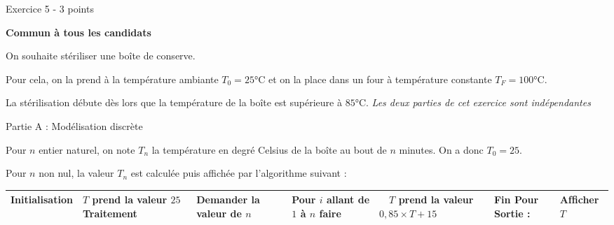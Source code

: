 
%
\begin{h2}Exercice 5 - 3 points\end{h2}
\textbf{Commun à tous les candidats}
\par
On souhaite stériliser une boîte de conserve.
\par
Pour cela, on la prend à la température ambiante $T_0 = 25$°C et on la place dans un four à température constante $T_F = 100$°C.
\par
La stérilisation débute dès lors que la température de la boîte est supérieure à $85$°C.
\textit{Les deux parties de cet exercice sont indépendantes}
\begin{h3}Partie A : Modélisation discrète\end{h3}
Pour $n$ entier naturel, on note $T_n$ la température en degré Celsius de la boîte au bout de $n$ minutes. On a donc $T_0 = 25$.
\par
Pour $n$ non nul, la valeur $T_n$ est calculée puis affichée par l'algorithme suivant :
   \begin{tabularx}{0.8\linewidth}{|*{3}{>{\centering \arraybackslash }X|}}%
          \hline

          \textbf{Initialisation}  &  $T$ prend la valeur $25$
          \hline
               \textbf{Traitement	}  & Demander la valeur de $n$
          \hline
       &  Pour $i$ allant de $1$ à $n$ faire
          \hline
& $  \quad T$ prend la valeur $0,85 \times T + 15$
          \hline
& Fin Pour
\textbf{Sortie }: &Afﬁcher $T$
          \\ \hline
     \end{tabularx}

